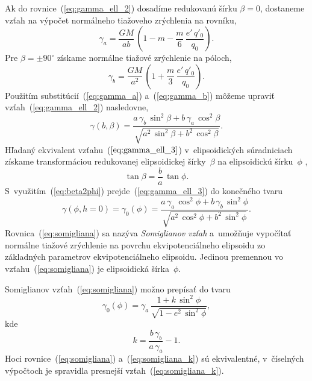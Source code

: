 \documentclass[a4paper, 12pt]{book}
\begin{document}
Ak do rovnice~(\ref{eq:gamma_ell_2}) dosadíme redukovanú šírku $\beta = 0$, 
dostaneme vzťah na výpočet normálneho tiažoveho zrýchlenia na rovníku,
%
\begin{equation}
\label{eq:gamma_a}
\gamma_a = \frac{GM}{ab} \, \left( 1 - m - \frac{m}{6} \, \frac{e' \, 
q'_0}{q_0} \right){.}
\end{equation}
%
Pre $\beta = \pm 90^\circ$ získame normálne tiažové zrýchlenie na póloch,
%
\begin{equation}
\label{eq:gamma_b}
\gamma_b = \frac{GM}{a^2} \, \left( 1 + \frac{m}{3} \, \frac{e' \, q'_0}{q_0} 
\right){.}
\end{equation}
%
Použitím substitúcií~(\ref{eq:gamma_a}) a~(\ref{eq:gamma_b}) môžeme upraviť 
vzťah~(\ref{eq:gamma_ell_2}) nasledovne,
%
\begin{equation}
\label{eq:gamma_ell_3}
\gamma(b, \beta) = \frac{a \, \gamma_b \, \sin^2\beta + b \, \gamma_a \, 
\cos^2\beta}{\sqrt{a^2 \, \sin^2\beta + b^2 \, \cos^2\beta}}{.}
\end{equation}
%
Hľadaný ekvivalent vzťahu~($\ref{eq:gamma_ell_3}$) v~elipsoidických 
súradniciach získame transformáciou redukovanej elipsoidickej šírky~$\beta$ na 
elipsoidickú šírku~$\phi$ \parencite[napríklad][]{MoritzPhysicalGeodesy},
%
\begin{equation}
\label{eq:beta2phi}
\tan \beta = \frac{b}{a} \, \tan\phi{.}
\end{equation}
%
S~využitím~(\ref{eq:beta2phi}) prejde~(\ref{eq:gamma_ell_3}) do konečného tvaru
%
\begin{equation}
\label{eq:somigliana}
\gamma(\phi, h = 0) = \gamma_0(\phi) = \frac{a \, \gamma_a \, \cos^2\phi + b \, 
\gamma_b \, \sin^2\phi}{\sqrt{a^2 \, \cos^2\phi + b^2 \, \sin^2\phi}}{.}
\end{equation}
%
Rovnica~(\ref{eq:somigliana}) sa nazýva \emph{Somiglianov vzťah} a~umožňuje 
vypočítať normálne tiažové zrýchlenie na povrchu ekvipotenciálneho elipsoidu zo 
základných parametrov ekvipotenciálneho elipsoidu.  Jedinou premennou vo 
vzťahu~(\ref{eq:somigliana}) je elipsoidická šírka~$\phi$.

Somiglianov vzťah~(\ref{eq:somigliana}) možno prepísať do tvaru 
\parencite{GRS80}
%
\begin{equation}
\label{eq:somigliana_k}
\gamma_0(\phi) = \gamma_a \, \frac{1 + k \, \sin^2\phi}{\sqrt{1 - e^2 \, 
\sin^2\phi}}{,}
\end{equation}
%
kde
%
\begin{equation}
k = \frac{b \, \gamma_b}{a \, \gamma_a} - 1{.}
\end{equation}
%
Hoci rovnice~(\ref{eq:somigliana}) a~(\ref{eq:somigliana_k}) sú ekvivalentné, 
v~číselných výpočtoch je spravidla presnejší vzťah~(\ref{eq:somigliana_k}).
\end{document}
